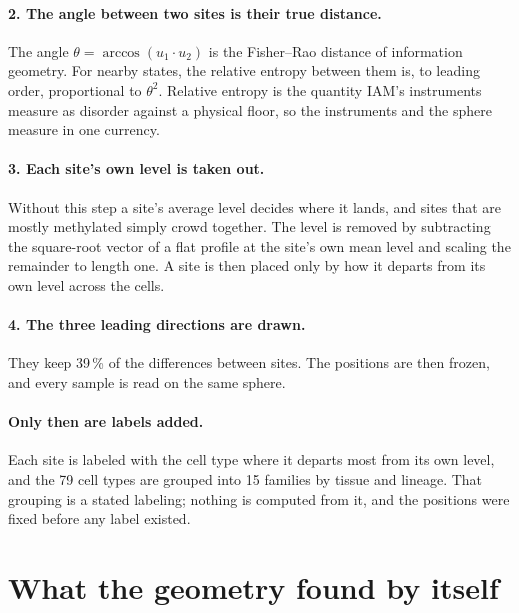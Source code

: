 \paragraph{2. The angle between two sites is their true distance.} The angle $\theta = \arccos(u_1\cdot u_2)$ is the Fisher--Rao
distance of information geometry. For nearby states, the relative entropy between them is, to leading order, proportional to $\theta^2$.
Relative entropy is the quantity IAM's instruments measure as disorder against a physical floor, so the instruments and the sphere
measure in one currency.

\paragraph{3. Each site's own level is taken out.} Without this step a site's average level decides where it lands, and sites that are
mostly methylated simply crowd together. The level is removed by subtracting the square-root vector of a flat profile at the site's own
mean level and scaling the remainder to length one. A site is then placed only by how it departs from its own level across the cells.

\paragraph{4. The three leading directions are drawn.} They keep 39\,\% of the differences between sites. The positions are then frozen,
and every sample is read on the same sphere.

\paragraph{Only then are labels added.} Each site is labeled with the cell type where it departs most from its own level, and the 79
cell types are grouped into 15 families by tissue and lineage. That grouping is a stated labeling; nothing is computed from it, and the
positions were fixed before any label existed.

\section{What the geometry found by itself}

